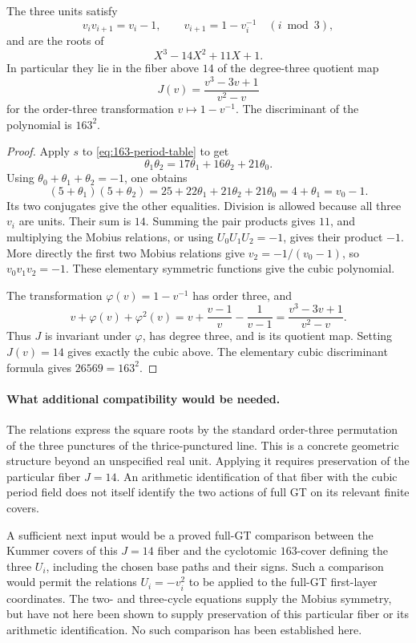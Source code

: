 \begin{lemma}
\label{lem:163-mobius-period-fiber}
The three units satisfy
\[
 v_iv_{i+1}=v_i-1,\qquad
 v_{i+1}=1-v_i^{-1}\quad(i\bmod3),
\]
and are the roots of
\[
 X^3-14X^2+11X+1.
\]
In particular they lie in the fiber above \(14\) of the
degree-three quotient map
\[
 J(v)=\frac{v^3-3v+1}{v^2-v}
\]
for the order-three transformation \(v\mapsto1-v^{-1}\).
The discriminant of the polynomial is \(163^2\).
\end{lemma}

\begin{proof}
Apply \(s\) to \eqref{eq:163-period-table} to get
\[
 \theta_1\theta_2=17\theta_1+16\theta_2+21\theta_0.
\]
Using \(\theta_0+\theta_1+\theta_2=-1\), one obtains
\[
 (5+\theta_1)(5+\theta_2)
 =25+22\theta_1+21\theta_2+21\theta_0
 =4+\theta_1=v_0-1.
\]
Its two conjugates give the other equalities.  Division is allowed
because all three \(v_i\) are units.  Their sum is \(14\).
Summing the pair products gives \(11\), and multiplying the
Mobius relations, or using \(U_0U_1U_2=-1\), gives their product
\(-1\).  More directly the first two Mobius relations give
\(v_2=-1/(v_0-1)\), so \(v_0v_1v_2=-1\).
These elementary symmetric functions give the cubic polynomial.

The transformation \(\varphi(v)=1-v^{-1}\) has order three, and
\[
 v+\varphi(v)+\varphi^2(v)
   =v+\frac{v-1}{v}-\frac1{v-1}
   =\frac{v^3-3v+1}{v^2-v}.
\]
Thus \(J\) is invariant under \(\varphi\), has degree three,
and is its quotient map.  Setting \(J(v)=14\) gives exactly
the cubic above.  The elementary cubic discriminant formula gives
\(26569=163^2\).
\end{proof}

\paragraph{What additional compatibility would be needed.}
The relations express the square roots by the standard order-three
permutation of the three punctures of the thrice-punctured line.
This is a concrete geometric structure beyond an unspecified real
unit.  Applying it requires preservation of the particular fiber
\(J=14\).  An arithmetic identification
of that fiber with the cubic period field does not itself identify
the two actions of full GT on its relevant finite covers.

A sufficient next input would be a proved full-GT comparison between
the Kummer covers of this \(J=14\) fiber and the cyclotomic
\(163\)-cover defining the three \(U_i\), including the chosen
base paths and their signs.  Such a comparison would permit the
relations \(U_i=-v_i^2\) to be applied to the full-GT first-layer
coordinates.  The two- and three-cycle equations supply the Mobius
symmetry, but have not here been shown to supply preservation of
this particular fiber or its arithmetic identification.  No such comparison has been established here.
